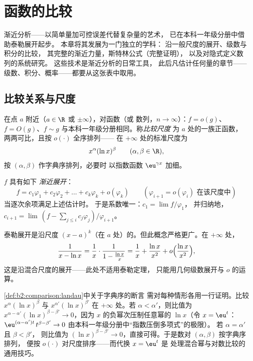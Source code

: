 \chapter{函数的比较}\label{ch:b2:comparison}

渐近分析——以简单量加可控误差代替复杂量的艺术，
已在本科一年级分册中借助泰勒展开起步。
本章将其发展为一门独立的学科：
沿一般尺度的展开、级数与积分的比较，
其完整的渐近力量，斯特林公式（完整证明），
以及对隐式定义数列的系统研究。
这些技术是渐近分析的日常工具，
此后凡估计任何量的章节——
级数、积分、概率——都要从这张表中取用。

\section{比较关系与尺度}

\begin{definition}\label{def:b2:comparison:landau}
在点 $a$ 附近（$a \in \R$ 或 $\pm\infty$），对函数（或
数列，$n \to \infty$）：$f = o(g)$、$f = O(g)$、$f \sim g$
与本科一年级分册相同。称\emph{比较尺度}
为 $a$ 处的一族正函数，
两两可比，且按 $o(\cdot)$ 全序排列——
在 $+\infty$ 处的标准尺度为
\[
x^{\alpha} (\ln x)^{\beta}
\qquad (\alpha, \beta \in \R),
\]
按 $(\alpha, \beta)$ 作字典序排列，必要时
以指数函数 $\eu^{\gamma x}$ 加细。
\end{definition}

\begin{definition}[渐近展开]\label{def:b2:comparison:expansion}
$f$ 具有如下
\emph{渐近展开}：
\[
f = c_1 \varphi_1 + c_2\varphi_2 + \dots + c_k \varphi_k +
o(\varphi_k)
\qquad (\varphi_{i+1} = o(\varphi_i) \text{ 在该尺度中})
\]
当逐次余项满足上述估计时。
于是系数唯一：$c_1 = \lim f/\varphi_1$，
并归纳地，$c_{i+1} = \lim\,(f - \sum_{j \leq i}
c_j\varphi_j)/\varphi_{i+1}$。
\end{definition}

\begin{example}
泰勒展开是沿尺度 $(x -
a)^k$（在 $a$ 处）的。但此概念严格更广。在 $+\infty$ 处，
\[
\frac{1}{x - \ln x}
= \frac1x \cdot \frac{1}{1 - \frac{\ln x}{x}}
= \frac1x + \frac{\ln x}{x^2} + o\Bigl(\frac{\ln x}{x^2}\Bigr),
\]
这是沿混合尺度的展开——此处不适用泰勒定理，
只能用几何级数展开与 $o$ 的运算。
\end{example}

\begin{example}[标准尺度确实有序]\label{ex:b2:comparison:scaleorder}
\cref{def:b2:comparison:landau}中关于字典序的断言
需对每种情形各用一行证明。比较
$x^{\alpha}(\ln x)^{\beta}$ 与 $x^{\alpha'}(\ln x)^{\beta'}$
在 $+\infty$ 处。若 $\alpha < \alpha'$，则比值为
$x^{\alpha - \alpha'}(\ln x)^{\beta - \beta'} \to 0$，因为
$x$ 的负幂次压制任意幂的 $\ln x$（令 $x =
\eu^t$：$\eu^{(\alpha - \alpha')t}\,t^{\beta - \beta'} \to 0$
由本科一年级分册中“指数压倒多项式”的极限）。
若 $\alpha = \alpha'$ 且 $\beta < \beta'$，
则比值为 $(\ln x)^{\beta - \beta'} \to 0$，直接可得。于是数对
$(\alpha, \beta)$ 按字典序排列，
便按 $o(\cdot)$ 对尺度排序——而代换 $x = \eu^t$ 是
处理混合幂与对数比较的通用技巧。
\end{example}


